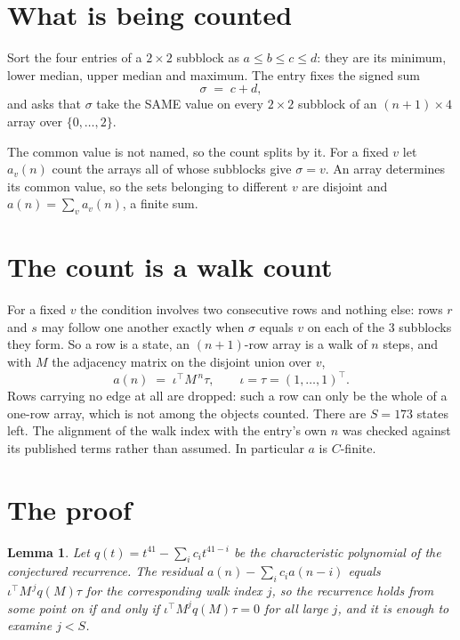 \documentclass[11pt,a4paper]{article}
\theoremstyle{plain}
\newtheorem{lemma}[theorem]{Lemma}
\theoremstyle{definition}
\begin{document}
\section{What is being counted}

Sort the four entries of a $2\times2$ subblock as $a\le b\le c\le d$: they
are its minimum, lower median, upper median and maximum. The entry fixes the signed sum
\[
\sigma\;=\;c+d,
\]
and asks that $\sigma$ take the SAME value on every $2\times2$ subblock of an
$(n+1)\times4$ array over $\{0,\dots,2\}$.

The common value is not named, so the count splits by it. For a fixed $v$ let $a_v(n)$ count
the arrays all of whose subblocks give $\sigma=v$. An array determines its common value, so
the sets belonging to different $v$ are disjoint and $a(n)=\sum_v a_v(n)$, a finite sum.


\section{The count is a walk count}

For a fixed $v$ the condition involves two consecutive rows and nothing
else: rows $r$ and $s$ may follow one another exactly when $\sigma$ equals $v$ on each of the
$3$ subblocks they form. So a row is a state, an $(n+1)$-row array is a walk of $n$
steps, and with $M$ the adjacency matrix on the disjoint union over $v$,
\[
a(n)\;=\;\iota^{\!\top}M^{\,n}\tau,\qquad\iota=\tau=(1,\dots,1)^{\!\top} .
\]
Rows carrying no edge at all are dropped: such a row can only be the whole of a one-row
array, which is not among the objects counted. There are $S=173$ states left.
The alignment of the walk index with the entry's own $n$ was checked against its published
terms rather than assumed. In particular $a$ is $C$-finite.

\section{The proof}

\begin{lemma}\label{lem:crit}
Let $q(t)=t^{41}-\sum_i c_it^{41-i}$ be the characteristic polynomial of the
conjectured recurrence. The residual $a(n)-\sum_ic_ia(n-i)$ equals
$\iota^{\!\top}M^{\,j}q(M)\tau$ for the corresponding walk index $j$, so the recurrence
holds from some point on if and only if $\iota^{\!\top}M^{j}q(M)\tau=0$ for all large $j$,
and it is enough to examine $j<S$.
\end{lemma}
\end{document}
